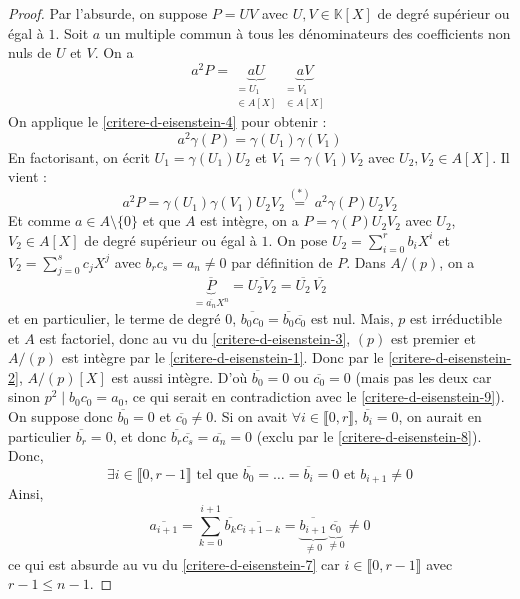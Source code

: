   \begin{proof}
    Par l'absurde, on suppose $P = UV$ avec $U, V \in \mathbb{K}[X]$ de degré supérieur ou égal à $1$. Soit $a$ un multiple commun à tous les dénominateurs des coefficients non nuls de $U$ et $V$. On a
    \[ a^2 P = \underbrace{a U}_{\substack{= U_1 \\ \in A[X]}} \underbrace{a V}_{\substack{= V_1 \\ \in A[X]}} \]
    On applique le \cref{critere-d-eisenstein-4} pour obtenir :
    \[ a^2 \gamma(P) = \gamma(U_1) \gamma(V_1) \tag{$*$} \]
    En factorisant, on écrit $U_1 = \gamma(U_1) U_2$ et $V_1 = \gamma(V_1) V_2$ avec $U_2, V_2 \in A[X]$. Il vient :
    \[ a^2 P = \gamma(U_1) \gamma(V_1) U_2 V_2 \overset{(*)}{=} a^2 \gamma(P) U_2 V_2 \]
    Et comme $a \in A \setminus \{ 0 \}$ et que $A$ est intègre, on a $P = \gamma(P) U_2 V_2$ avec $U_2$, $V_2 \in A[X]$ de degré supérieur ou égal à $1$.
    \newpar
    On pose $U_2 = \sum_{i=0}^r b_i X^i$ et $V_2 = \sum_{j=0}^s c_j X^j$ avec $b_r c_s = a_n \neq 0$ par définition de $P$. Dans $A/(p)$, on a
    \[ \underbrace{\overline{P}}_{= \overline{a_n} X^n} = \overline{U_2 V_2} = \overline{U_2} \, \overline{V_2} \]
    et en particulier, le terme de degré $0$, $\overline{b_0 c_0} = \overline{b_0} \overline{c_0}$ est nul. Mais, $p$ est irréductible et $A$ est factoriel, donc au vu du \cref{critere-d-eisenstein-3}, $(p)$ est premier et $A/(p)$ est intègre par le \cref{critere-d-eisenstein-1}. Donc par le \cref{critere-d-eisenstein-2}, $A/(p)[X]$ est aussi intègre. D'où $\overline{b_0} = 0$ ou $\overline{c_0} = 0$ (mais pas les deux car sinon $p^2 \mid b_0 c_0 = a_0$, ce qui serait en contradiction avec le \cref{critere-d-eisenstein-9}).
    \newpar
    On suppose donc $\overline{b_0} = 0$ et $\overline{c_0} \neq 0$. Si on avait $\forall i \in \llbracket 0, r \rrbracket$, $\overline{b_i} = 0$, on aurait en particulier $\overline{b_r} = 0$, et donc $\overline{b_r} \overline{c_s} = \overline{a_n} = 0$ (exclu par le \cref{critere-d-eisenstein-8}). Donc,
    \[ \exists i \in \llbracket 0, r-1 \rrbracket \text{ tel que } \overline{b_0} = \dots = \overline{b_i} = 0 \text{ et } b_{i+1} \neq 0 \]
    Ainsi,
    \[ \overline{a_{i+1}} = \sum_{k=0}^{i+1} \overline{b_k} \overline{c_{i+1-k}} = \underbrace{\overline{b_{i+1}}}_{\neq 0} \underbrace{\overline{c_0}}_{\neq 0} \neq 0 \]
    ce qui est absurde au vu du \cref{critere-d-eisenstein-7} car $i \in \llbracket 0, r-1 \rrbracket$ avec $r-1 \leq n-1$.
  \end{proof}


